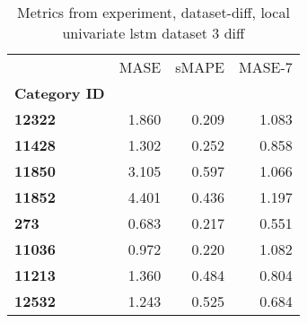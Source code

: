 \begin{table}[h]
\centering
\caption{Metrics from experiment, dataset-diff, local univariate lstm dataset 3 diff}
\label{table:local-univariate-lstm-dataset-3-diff-dataset-diff}
\begin{tabular}{lrrr}
\toprule
{} &   MASE &  sMAPE &  MASE-7 \\
\textbf{Category ID} &        &        &         \\
\midrule
\textbf{12322      } &  1.860 &  0.209 &   1.083 \\
\textbf{11428      } &  1.302 &  0.252 &   0.858 \\
\textbf{11850      } &  3.105 &  0.597 &   1.066 \\
\textbf{11852      } &  4.401 &  0.436 &   1.197 \\
\textbf{273        } &  0.683 &  0.217 &   0.551 \\
\textbf{11036      } &  0.972 &  0.220 &   1.082 \\
\textbf{11213      } &  1.360 &  0.484 &   0.804 \\
\textbf{12532      } &  1.243 &  0.525 &   0.684 \\
\bottomrule
\end{tabular}
\end{table}
